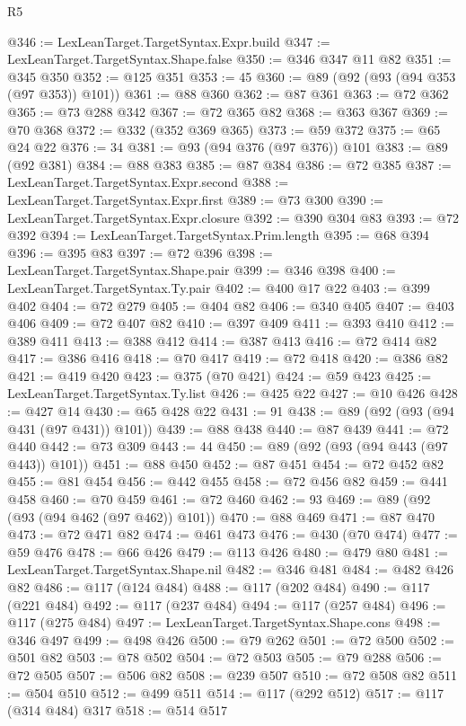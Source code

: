 \begin{lexlean}{R5}
\begin{coremodule}
{{{{{{{{{{{{{{{{{{{{{{{{{{{{{{{{{{{{{{{{{{{{{{{{{{{{{{{{{{{{{{{{{{{{{{{{{{{{{{{{{{{{{{{{{{{{@346 := LexLeanTarget.TargetSyntax.Expr.build
@347 := LexLeanTarget.TargetSyntax.Shape.false
@350 := @346 @347 @11 @82
@351 := @345 @350
@352 := @125 @351
@353 := 45
@360 := @89 (@92 (@93 (@94 @353 (@97 @353)) @101))
@361 := @88 @360
@362 := @87 @361
@363 := @72 @362
@365 := @73 @288 @342
@367 := @72 @365 @82
@368 := @363 @367
@369 := @70 @368
@372 := @332 (@352 @369 @365)
@373 := @59 @372
@375 := @65 @24 @22
@376 := 34
@381 := @93 (@94 @376 (@97 @376)) @101
@383 := @89 (@92 @381)
@384 := @88 @383
@385 := @87 @384
@386 := @72 @385
@387 := LexLeanTarget.TargetSyntax.Expr.second
@388 := LexLeanTarget.TargetSyntax.Expr.first
@389 := @73 @300
@390 := LexLeanTarget.TargetSyntax.Expr.closure
@392 := @390 @304 @83
@393 := @72 @392
@394 := LexLeanTarget.TargetSyntax.Prim.length
@395 := @68 @394
@396 := @395 @83
@397 := @72 @396
@398 := LexLeanTarget.TargetSyntax.Shape.pair
@399 := @346 @398
@400 := LexLeanTarget.TargetSyntax.Ty.pair
@402 := @400 @17 @22
@403 := @399 @402
@404 := @72 @279
@405 := @404 @82
@406 := @340 @405
@407 := @403 @406
@409 := @72 @407 @82
@410 := @397 @409
@411 := @393 @410
@412 := @389 @411
@413 := @388 @412
@414 := @387 @413
@416 := @72 @414 @82
@417 := @386 @416
@418 := @70 @417
@419 := @72 @418
@420 := @386 @82
@421 := @419 @420
@423 := @375 (@70 @421)
@424 := @59 @423
@425 := LexLeanTarget.TargetSyntax.Ty.list
@426 := @425 @22
@427 := @10 @426
@428 := @427 @14
@430 := @65 @428 @22
@431 := 91
@438 := @89 (@92 (@93 (@94 @431 (@97 @431)) @101))
@439 := @88 @438
@440 := @87 @439
@441 := @72 @440
@442 := @73 @309
@443 := 44
@450 := @89 (@92 (@93 (@94 @443 (@97 @443)) @101))
@451 := @88 @450
@452 := @87 @451
@454 := @72 @452 @82
@455 := @81 @454
@456 := @442 @455
@458 := @72 @456 @82
@459 := @441 @458
@460 := @70 @459
@461 := @72 @460
@462 := 93
@469 := @89 (@92 (@93 (@94 @462 (@97 @462)) @101))
@470 := @88 @469
@471 := @87 @470
@473 := @72 @471 @82
@474 := @461 @473
@476 := @430 (@70 @474)
@477 := @59 @476
@478 := @66 @426
@479 := @113 @426
@480 := @479 @80
@481 := LexLeanTarget.TargetSyntax.Shape.nil
@482 := @346 @481
@484 := @482 @426 @82
@486 := @117 (@124 @484)
@488 := @117 (@202 @484)
@490 := @117 (@221 @484)
@492 := @117 (@237 @484)
@494 := @117 (@257 @484)
@496 := @117 (@275 @484)
@497 := LexLeanTarget.TargetSyntax.Shape.cons
@498 := @346 @497
@499 := @498 @426
@500 := @79 @262
@501 := @72 @500
@502 := @501 @82
@503 := @78 @502
@504 := @72 @503
@505 := @79 @288
@506 := @72 @505
@507 := @506 @82
@508 := @239 @507
@510 := @72 @508 @82
@511 := @504 @510
@512 := @499 @511
@514 := @117 (@292 @512)
@517 := @117 (@314 @484) @317
@518 := @514 @517
}}}}}}}}}}}}}}}}}}}}}}}}}}}}}}}}}}}}}}}}}}}}}}}}}}}}}}}}}}}}}}}}}}}}}}}}}}}}}}}}}}}}}}}}}}}}
\end{coremodule}
\end{lexlean}
